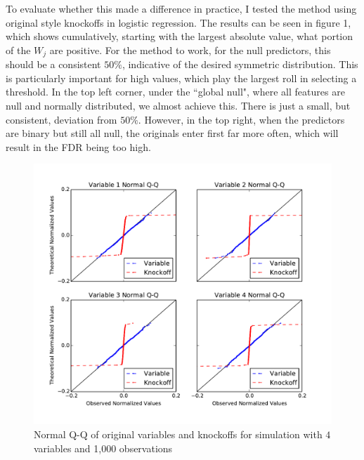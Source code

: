 \documentclass[11pt]{article}
\theoremstyle{definition}
\begin{document}
    \FloatBarrier


    To evaluate whether this made a difference in practice, I tested the method using original style knockoffs in logistic regression. The results can be seen in figure 1, which shows cumulatively, starting with the largest absolute value, what portion of the $W_j$ are positive. For the method to work, for the null predictors, this should be a consistent $50\%$, indicative of the desired symmetric distribution. This is particularly important for high values, which play the largest roll in selecting a threshold. In the top left corner, under the ``global null", where all features are null and normally distributed, we almost achieve this. There is just a small, but consistent, deviation from $50\%$. However, in the top right, when the predictors are binary but still all null, the originals enter first far more often, which will result in the FDR being too high. \par
    \begin{figure}[h]
        \begin{center}
            \includegraphics[width=14cm]{images/normalQQ}
            \caption{\linespread{1}\selectfont{}Normal Q-Q of original variables and knockoffs for simulation with $4$ variables and 1,000 observations}
        \end{center}
    \end{figure}
\end{document}
